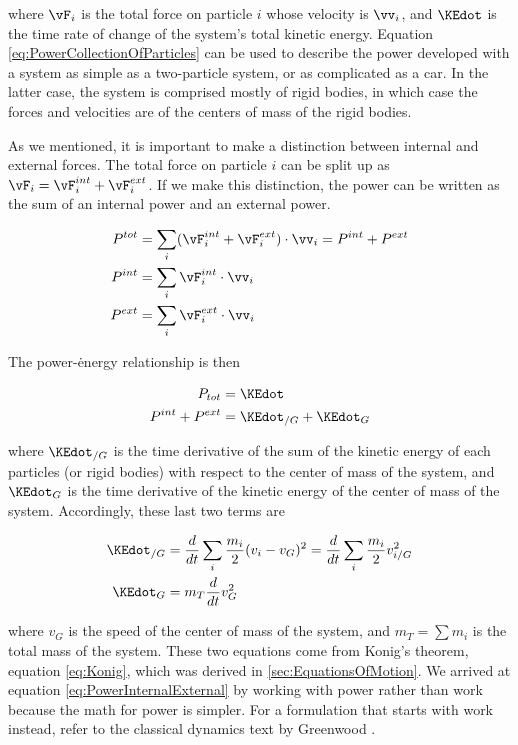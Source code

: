 where $\vF_{i}$ is the total force on particle $i$ whose velocity is $\vv_{i}$, and $\KEdot$ is the time rate of change of the system's total kinetic energy. Equation \ref{eq:PowerCollectionOfParticles} can be used to describe the power developed with a system as simple as a two-particle system, or as complicated as a car. In the latter case, the system is comprised mostly of rigid bodies, in which case the forces and velocities are of the centers of mass of the rigid bodies.

As we mentioned, it is important to make a distinction between internal and external forces. The total force on particle $i$ can be split up as $\vF_{i} = \vF_{i}^{int} + \vF_{i}^{ext}$. If we make this distinction, the power can be written as the sum of an internal power and an external power.

\begin{align}
P^{tot} &= \sum_{i} (\vF_{i}^{int} + \vF_{i}^{ext}) \cdot \vv_{i} = P^{int} + P^{ext}\\
P^{int} &= \sum_{i} \vF_{i}^{int} \cdot \vv_{i} \\
P^{ext} &= \sum_{i} \vF_{i}^{ext} \cdot \vv_{i}
\end{align}

The power-\.{energy} relationship is then

\begin{align}
P_{tot} &=  \KEdot\\
P^{int} + P^{ext} &= \KEdot_{/G} + \KEdot_{G}
\label{eq:PowerInternalExternal}
\end{align}

where $\KEdot_{/G}$ is the time derivative of the sum of the kinetic energy of each particles (or rigid bodies) with respect to the center of mass of the system, and $\KEdot_{G}$ is the time derivative of the kinetic energy of the center of mass of the system. Accordingly, these last two terms are

\begin{align}
\KEdot_{/G} &= \frac{d}{dt} \sum_{i} \frac{m_i}{2}(v_{i} - v_{G})^{2} = \frac{d}{dt} \sum_{i} \frac{m_i}{2} v_{i/G}^{2} \\
\KEdot_{G} &= m_{T} \frac{d}{dt} v_{G}^{2}
\end{align}

where $v_{G}$ is the speed of the center of mass of the system, and $m_{T} = \sum m_i$ is the total mass of the system. These two equations come from Konig's theorem, equation \ref{eq:Konig}, which was derived in \ref{sec:EquationsOfMotion}. We arrived at equation \ref{eq:PowerInternalExternal} by working with power rather than work because the math for power is simpler. For a formulation that starts with work instead, refer to the classical dynamics text by Greenwood \cite{greenwood}.

